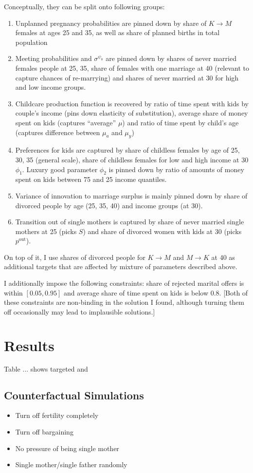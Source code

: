 \documentclass[12pt,letter]{article}
\begin{document}
Conceptually, they can be split onto following groups:
\begin{enumerate}
\item Unplanned pregnancy probabilities are pinned down by share of $K\to M$ females at ages 25 and 35, as well as share of planned births in total population
\item Meeting probabilities and $\sigma^{\psi_0}$ are pinned down by shares of never married females people at 25, 35, share of females with one marriage at 40 (relevant to capture chances of re-marrying) and shares of never married at 30 for high and low income groups.
\item Childcare production function is recovered by ratio of time spent with kids by couple's income (pins down elasticity of substitution), average share of money spent on kids (captures ``average'' $\mu$) and ratio of time spent by child's age (captures difference between $\mu_a$ and $\mu_y$)
\item  Preferences for kids are captured by share of childless females by age of 25, 30, 35 (general scale), share of childless females for low and high income at 30 $\phi_1$. Luxury good parameter $\phi_2$ is pinned down by ratio of amounts of money spent on kids between 75 and 25 income quantiles.
\item Variance of innovation to marriage surplus is mainly pinned down by share of divorced people by age (25, 35, 40) and income groups (at 30).
\item Transition out of single mothers is captured by share of never married single mothers at 25 (picks $S$) and share of divorced women with kids at 30 (picks $p^{\text{out}}$).
\end{enumerate}
On top of it, I use shares of divorced people for $K\to M$ and $M \to K$ at 40 as additional targets that are affected by mixture of parameters described above.

I additionally impose the following constraints: share of rejected marital offers is within $[0.05,0.95]$ and average share of time spent on kids is below $0.8$. [Both of these constraints are non-binding in the solution I found, although turning them off occasionally may lead to implausible solutions.]


\section{Results}
Table ... shows targeted and 

\subsection{Counterfactual Simulations}
\begin{itemize}
\item Turn off fertility completely
\item Turn off bargaining
\item No pressure of being single mother
\item Single mother/single father randomly
\end{itemize}
\end{document}
